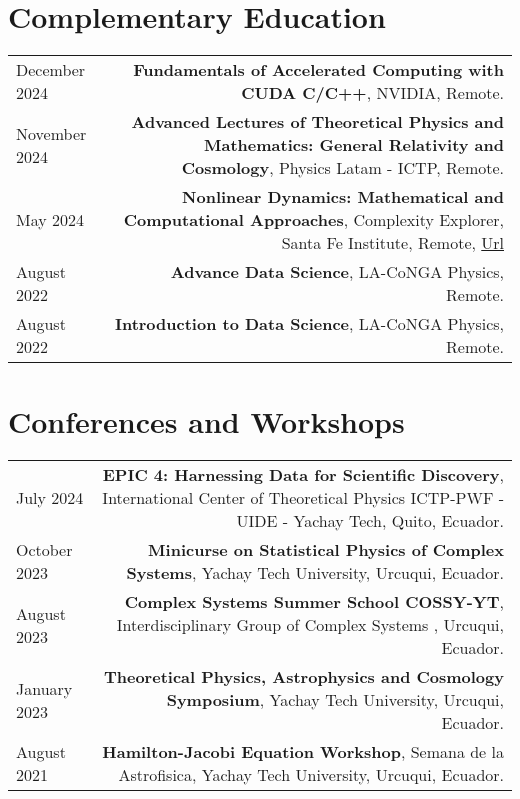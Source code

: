 \documentclass{article}
\begin{document}
\section*{Complementary Education}
\begin{tabular}{L!{\vrule}R}
	
	  December 2024 & \textbf{Fundamentals of Accelerated Computing with CUDA C/C++}, NVIDIA, Remote.\\
    November 2024 & \textbf{Advanced Lectures of Theoretical Physics and Mathematics: General Relativity and Cosmology}, Physics Latam - ICTP, Remote. \\ 

    May 2024 & \textbf{Nonlinear Dynamics: Mathematical and Computational Approaches}, Complexity Explorer, Santa Fe Institute, Remote, \href{https://www.complexityexplorer.org/courses/184-nonlinear-dynamics-mathematical-and-computational-approaches/certificates/3966304258}{Url}\\

    August 2022 & \textbf{Advance Data Science}, LA-CoNGA Physics, Remote. \\

    August 2022 & \textbf{Introduction to Data Science}, LA-CoNGA Physics, Remote. \\


\end{tabular}

\section*{Conferences and Workshops}
\begin{tabular}{L!{\vrule}R}

    July 2024 & \textbf{EPIC 4: Harnessing Data for Scientific Discovery}, International Center of Theoretical Physics ICTP-PWF - UIDE - Yachay Tech, Quito, Ecuador.\\
    
    October 2023 & \textbf{Minicurse on Statistical Physics of Complex Systems}, Yachay Tech University, Urcuqui, Ecuador. \\

    August 2023 & \textbf{Complex Systems Summer School COSSY-YT}, Interdisciplinary Group of Complex Systems , Urcuqui, Ecuador. \\

    January 2023 & \textbf{Theoretical Physics, Astrophysics and Cosmology Symposium}, Yachay Tech University, Urcuqui, Ecuador. \\

    August 2021 & \textbf{Hamilton-Jacobi Equation Workshop}, Semana de la Astrofisica, Yachay Tech University, Urcuqui, Ecuador. \\



\end{tabular}
\end{document}
